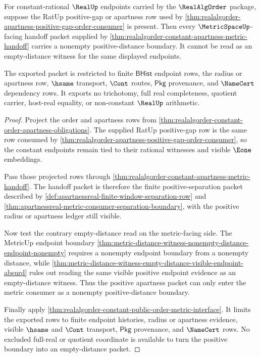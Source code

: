 \begin{theorem}
\label{thm:realalgorder-positive-apartness-nonzero-metric-boundary}
For constant-rational $\RealUp$ endpoints carried by the $\RealAlgOrder$
package, suppose the RatUp positive-gap or apartness row used by
\autoref{thm:realalgorder-apartness-positive-gap-order-consumer} is present.
Then every $\MetricSpaceUp$-facing handoff packet supplied by
\autoref{thm:realalgorder-constant-apartness-metric-handoff} carries a
nonempty positive-distance boundary. It cannot be read as an empty-distance
witness for the same displayed endpoints.

The exported packet is restricted to finite $\mathsf{BHist}$ endpoint rows,
the radius or apartness row, $\hsame$ transport, $\Cont$ routes,
$\mathsf{Pkg}$ provenance, and $\NameCert$ dependency rows. It exports no
trichotomy, full real completeness, quotient carrier, host-real equality, or
non-constant $\RealUp$ arithmetic.
\end{theorem}
\begin{proof}
Project the order and apartness rows from
\autoref{thm:realalgorder-constant-order-apartness-obligations}. The supplied
RatUp positive-gap row is the same row consumed by
\autoref{thm:realalgorder-apartness-positive-gap-order-consumer}, so the
constant endpoints remain tied to their rational witnesses and visible
$\Eone$ embeddings.

Pass those projected rows through
\autoref{thm:realalgorder-constant-apartness-metric-handoff}. The handoff
packet is therefore the finite positive-separation packet described by
\autoref{def:apartnessreal-finite-window-separation-row} and
\autoref{thm:apartnessreal-metric-consumer-separation-boundary}, with the
positive radius or apartness ledger still visible.

Now test the contrary empty-distance read on the metric-facing side. The
MetricUp endpoint boundary
\autoref{thm:metric-distance-witness-nonempty-distance-endpoint-nonempty}
requires a nonempty endpoint boundary from a nonempty distance, while
\autoref{thm:metric-distance-witness-empty-distance-visible-endpoint-absurd}
rules out reading the same visible positive endpoint evidence as an
empty-distance witness. Thus the positive apartness packet can only enter the
metric consumer as a nonempty positive-distance boundary.

Finally apply
\autoref{thm:realalgorder-constant-public-order-metric-interface}. It limits
the exported rows to finite endpoint histories, radius or apartness evidence,
visible $\hsame$ and $\Cont$ transport, $\mathsf{Pkg}$ provenance, and
$\NameCert$ rows. No excluded full-real or quotient coordinate is available to
turn the positive boundary into an empty-distance packet.
\end{proof}

